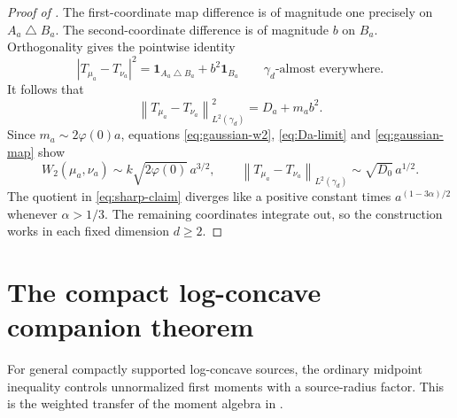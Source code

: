 \documentclass[11pt]{article}
\numberwithin{equation}{section}
\theoremstyle{remark}
\newcommand{\ind}{\mathbf 1}
\newcommand{\norm}[1]{\left\lVert #1\right\rVert}
\begin{document}
\begin{proof}[Proof of ]
The first-coordinate map difference is of magnitude one precisely on $A_a\mathbin\triangle B_a$. The second-coordinate difference is of magnitude $b$ on $B_a$. Orthogonality gives the pointwise identity
\[
 |T_{\mu_a}-T_{\nu_a}|^2
 =\ind_{A_a\mathbin\triangle B_a}+b^2\ind_{B_a}
 \qquad\gamma_d\text{-almost everywhere}.
\]
It follows that
\begin{equation}\label{eq:gaussian-map}
 \norm{T_{\mu_a}-T_{\nu_a}}_{L^2(\gamma_d)}^2=D_a+m_ab^2.
\end{equation}
Since $m_a\sim2\varphi(0)a$, equations \eqref{eq:gaussian-w2}, \eqref{eq:Da-limit} and \eqref{eq:gaussian-map} show
\[
 W_2(\mu_a,\nu_a)\sim k\sqrt{2\varphi(0)}\,a^{3/2},
 \qquad
 \norm{T_{\mu_a}-T_{\nu_a}}_{L^2(\gamma_d)}\sim\sqrt{D_0}\,a^{1/2}.
\]
The quotient in \eqref{eq:sharp-claim} diverges like a positive constant times $a^{(1-3\alpha)/2}$ whenever $\alpha>1/3$. The remaining coordinates integrate out, so the construction works in each fixed dimension $d\ge2$.
\end{proof}

\section{The compact log-concave companion theorem}\label{sec:companion}
For general compactly supported log-concave sources, the ordinary midpoint inequality controls unnormalized first moments with a source-radius factor. This is the weighted transfer of the moment algebra in \cite{OpenAI2026}.
\end{document}
